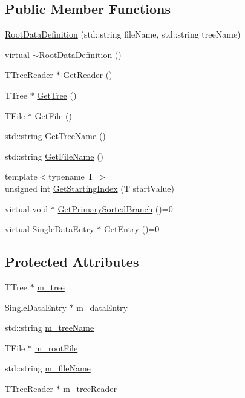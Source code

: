 \subsection*{Public Member Functions}
\begin{DoxyCompactItemize}
\item 
\hyperlink{classRootDataDefinition_aeb304a3a15314058d6663c45c7f8f00e}{Root\+Data\+Definition} (std\+::string file\+Name, std\+::string tree\+Name)
\item 
virtual \hyperlink{classRootDataDefinition_a40a873fba464bcb796a444db890385dc}{$\sim$\+Root\+Data\+Definition} ()
\item 
T\+Tree\+Reader $\ast$ \hyperlink{classRootDataDefinition_a48a885b44c954506728f71f07d927506}{Get\+Reader} ()
\item 
T\+Tree $\ast$ \hyperlink{classRootDataDefinition_a20ed89d6d2483a0f76cd2fb131fcc597}{Get\+Tree} ()
\item 
T\+File $\ast$ \hyperlink{classRootDataDefinition_ab26897ffdd1de5e6572f6067770066b3}{Get\+File} ()
\item 
std\+::string \hyperlink{classRootDataDefinition_acc7728b0a9315cacc6b9c1fae38ed490}{Get\+Tree\+Name} ()
\item 
std\+::string \hyperlink{classRootDataDefinition_a56f206839275fdf5af290b372c4d7e13}{Get\+File\+Name} ()
\item 
{\footnotesize template$<$typename T $>$ }\\unsigned int \hyperlink{classRootDataDefinition_a1d785995aed4450ddfa97c7064cc5dfc}{Get\+Starting\+Index} (T start\+Value)
\item 
virtual void $\ast$ \hyperlink{classRootDataDefinition_a720d0b9c122b778f2b338792de9e8c47}{Get\+Primary\+Sorted\+Branch} ()=0
\item 
virtual \hyperlink{classSingleDataEntry}{Single\+Data\+Entry} $\ast$ \hyperlink{classRootDataDefinition_a60bb9c8884bdaca62fa342bfa6cf0bdb}{Get\+Entry} ()=0
\end{DoxyCompactItemize}
\subsection*{Protected Attributes}
\begin{DoxyCompactItemize}
\item 
T\+Tree $\ast$ \hyperlink{classRootDataDefinition_a941ec585a2aa533bc30889a382e54f50}{m\+\_\+tree}
\item 
\hyperlink{classSingleDataEntry}{Single\+Data\+Entry} $\ast$ \hyperlink{classRootDataDefinition_a4d36dedf6212d7096b0020e9c1be9247}{m\+\_\+data\+Entry}
\item 
std\+::string \hyperlink{classRootDataDefinition_a46394bbb1863baa4abcd8cbd0413fa88}{m\+\_\+tree\+Name}
\item 
T\+File $\ast$ \hyperlink{classRootDataDefinition_af00a892a1b940abf9265066391b67304}{m\+\_\+root\+File}
\item 
std\+::string \hyperlink{classRootDataDefinition_a03154139db8613ec02cd57fd84d8c0e8}{m\+\_\+file\+Name}
\item 
T\+Tree\+Reader $\ast$ \hyperlink{classRootDataDefinition_a919827bdd245e61c0f54676d59cc7448}{m\+\_\+tree\+Reader}
\end{DoxyCompactItemize}


